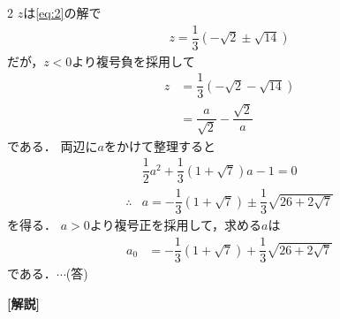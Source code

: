 \documentclass[../../main.tex]{subfiles}
\begin{document}
\begin{multicols}{2}
  $z$は\cref{eq:2}の解で
  \begin{align}
    z = \dfrac{1}{3}\left(-\sqrt{2} \pm \sqrt{14}\right)
  \end{align}
  だが，$z<0$より複号負を採用して
  \begin{align}
    z
    & = \dfrac{1}{3}\left(-\sqrt{2} - \sqrt{14}\right) \\
    & = \dfrac{a}{\sqrt{2}} - \dfrac{\sqrt{2}}{a}
  \end{align}
  である．
  両辺に$a$をかけて整理すると
  \begin{align}
    & \dfrac{1}{2}a^2 + \dfrac{1}{3}\left(1+\sqrt{7}\right)a -1 = 0      \\
    \therefore
    & a = - \dfrac{1}{3}(1+\sqrt{7}) \pm \dfrac{1}{3}\sqrt{26+2\sqrt{7}}
  \end{align}
  を得る．
  $a>0$より複号正を採用して，求める$a$は
  \begin{align}
    a_0
    & = -\dfrac{1}{3}(1+\sqrt{7}) + \dfrac{1}{3}\sqrt{26+2\sqrt{7}}
  \end{align}
  である．$\cdots$(答)

  {\bf [解説]}

  \newpage
\end{multicols}
\end{document}

